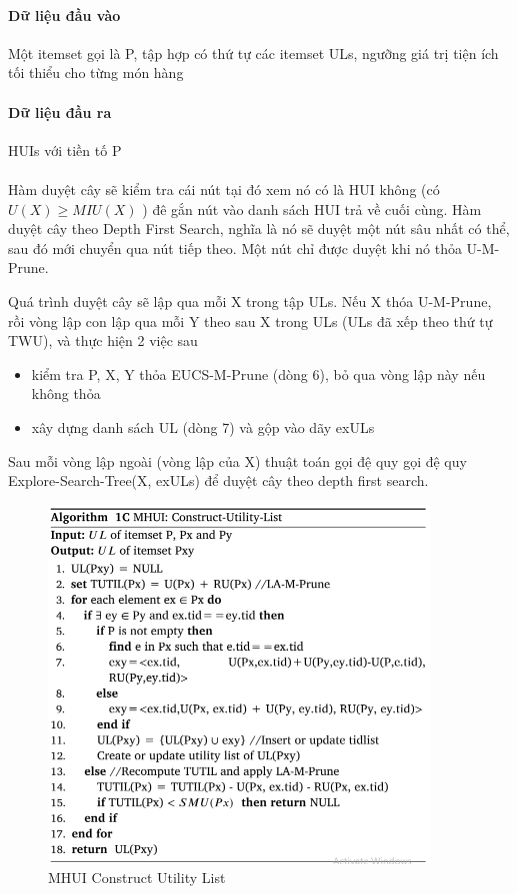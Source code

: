 \paragraph{Dữ liệu đầu vào} Một itemset gọi là P, tập hợp có thứ tự các itemset ULs, ngưỡng giá trị tiện ích tối thiểu cho từng món hàng

\paragraph{Dữ liệu đầu ra} HUIs với tiền tố P \\\\

Hàm duyệt cây sẽ kiểm tra cái nút tại đó xem nó có là HUI không (có $U(X) \geq MIU(X)$ ) đê gắn nút vào danh sách HUI trả về cuối cùng. Hàm duyệt cây theo Depth First Search, nghĩa là nó sẽ duyệt một nút sâu nhất có thể, sau đó mới chuyển qua nút tiếp theo. Một nút chỉ được duyệt khi nó thỏa U-M-Prune. 

Quá trình duyệt cây sẽ lập qua mỗi X trong tập ULs. Nếu X thóa U-M-Prune, rồi vòng lập con lập qua mỗi Y theo sau X trong ULs (ULs đã xếp theo thứ tự TWU), và thực hiện 2 việc sau 

\begin{itemize}
  \item kiểm tra P, X, Y thỏa EUCS-M-Prune (dòng 6), bỏ qua vòng lập này nếu không thỏa   
  \item xây dựng danh sách UL (dòng 7) và gộp vào dãy exULs
\end{itemize}
 
Sau mỗi vòng lập ngoài (vòng lập của X) thuật toán gọi đệ quy gọi đệ quy Explore-Search-Tree(X, exULs) để duyệt cây theo depth first search. 



\begin{figure}[h]
\centering
\includegraphics[width=0.9\textwidth]{image/algo/algo3.PNG}
\caption{\label{fig:algo2} MHUI Construct Utility List}
\end{figure}

